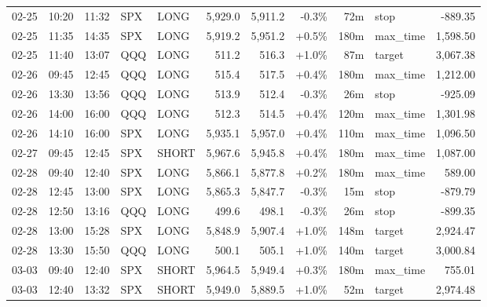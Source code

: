 \documentclass[11pt,a4paper,twoside]{article}
\begin{document}
\begin{center}
\begin{longtable}{>{\color{txtmain}}l l l l l r r r r >{\color{txtmain}}l r}
02-25 & 10:20 & 11:32 & SPX & LONG & 5,929.0 & 5,911.2 & \textcolor{lossred}{-0.3\%} & 72m & stop & \textcolor{lossred}{-889.35} \\
02-25 & 11:35 & 14:35 & SPX & LONG & 5,919.2 & 5,951.2 & \textcolor{wingreen}{+0.5\%} & 180m & max\_time & \textcolor{wingreen}{1,598.50} \\
02-25 & 11:40 & 13:07 & QQQ & LONG & 511.2 & 516.3 & \textcolor{wingreen}{+1.0\%} & 87m & target & \textcolor{wingreen}{3,067.38} \\
02-26 & 09:45 & 12:45 & QQQ & LONG & 515.4 & 517.5 & \textcolor{wingreen}{+0.4\%} & 180m & max\_time & \textcolor{wingreen}{1,212.00} \\
02-26 & 13:30 & 13:56 & QQQ & LONG & 513.9 & 512.4 & \textcolor{lossred}{-0.3\%} & 26m & stop & \textcolor{lossred}{-925.09} \\
02-26 & 14:00 & 16:00 & QQQ & LONG & 512.3 & 514.5 & \textcolor{wingreen}{+0.4\%} & 120m & max\_time & \textcolor{wingreen}{1,301.98} \\
02-26 & 14:10 & 16:00 & SPX & LONG & 5,935.1 & 5,957.0 & \textcolor{wingreen}{+0.4\%} & 110m & max\_time & \textcolor{wingreen}{1,096.50} \\
02-27 & 09:45 & 12:45 & SPX & SHORT & 5,967.6 & 5,945.8 & \textcolor{wingreen}{+0.4\%} & 180m & max\_time & \textcolor{wingreen}{1,087.00} \\
02-28 & 09:40 & 12:40 & SPX & LONG & 5,866.1 & 5,877.8 & \textcolor{wingreen}{+0.2\%} & 180m & max\_time & \textcolor{wingreen}{589.00} \\
02-28 & 12:45 & 13:00 & SPX & LONG & 5,865.3 & 5,847.7 & \textcolor{lossred}{-0.3\%} & 15m & stop & \textcolor{lossred}{-879.79} \\
02-28 & 12:50 & 13:16 & QQQ & LONG & 499.6 & 498.1 & \textcolor{lossred}{-0.3\%} & 26m & stop & \textcolor{lossred}{-899.35} \\
02-28 & 13:00 & 15:28 & SPX & LONG & 5,848.9 & 5,907.4 & \textcolor{wingreen}{+1.0\%} & 148m & target & \textcolor{wingreen}{2,924.47} \\
02-28 & 13:30 & 15:50 & QQQ & LONG & 500.1 & 505.1 & \textcolor{wingreen}{+1.0\%} & 140m & target & \textcolor{wingreen}{3,000.84} \\
03-03 & 09:40 & 12:40 & SPX & SHORT & 5,964.5 & 5,949.4 & \textcolor{wingreen}{+0.3\%} & 180m & max\_time & \textcolor{wingreen}{755.01} \\
03-03 & 12:40 & 13:32 & SPX & SHORT & 5,949.0 & 5,889.5 & \textcolor{wingreen}{+1.0\%} & 52m & target & \textcolor{wingreen}{2,974.48} \\

\end{longtable}
\end{center}
\end{document}

